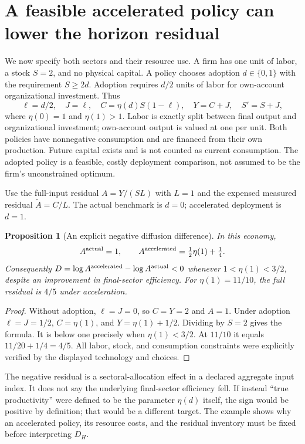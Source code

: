 \documentclass[11pt]{article}
\newtheorem{proposition}[theorem]{Proposition}
\theoremstyle{remark}
\begin{document}
\section{A feasible accelerated policy can lower the horizon residual}
We now specify both sectors and their resource use. A firm has one unit of labor, a stock $S=2$, and no physical capital. A policy chooses adoption $d\in\{0,1\}$ with the requirement $S\geq2d$. Adoption requires $d/2$ units of labor for own-account organizational investment. Thus
\[
 \ell=d/2,\quad J=\ell,\quad C=\eta(d)S(1-\ell),
 \quad Y=C+J,\quad S'=S+J,
\]
where $\eta(0)=1$ and $\eta(1)>1$. Labor is exactly split between final output and organizational investment; own-account output is valued at one per unit. Both policies have nonnegative consumption and are financed from their own production. Future capital exists and is not counted as current consumption. The adopted policy is a feasible, costly deployment comparison, not assumed to be the firm's unconstrained optimum.

Use the full-input residual $A=Y/(SL)$ with $L=1$ and the expensed measured residual $\widetilde A=C/L$. The actual benchmark is $d=0$; accelerated deployment is $d=1$.

\begin{proposition}[An explicit negative diffusion difference]\label{negative}
In this economy,
\[
 A^{\rm actual}=1,\qquad A^{\rm accelerated}=\tfrac12\eta(1)+\tfrac14.
\]
Consequently $D=\log A^{\rm accelerated}-\log A^{\rm actual}<0$ whenever $1<\eta(1)<3/2$, despite an improvement in final-sector efficiency. For $\eta(1)=11/10$, the full residual is $4/5$ under acceleration.
\end{proposition}
\begin{proof}
Without adoption, $\ell=J=0$, so $C=Y=2$ and $A=1$. Under adoption $\ell=J=1/2$, $C=\eta(1)$, and $Y=\eta(1)+1/2$. Dividing by $S=2$ gives the formula. It is below one precisely when $\eta(1)<3/2$. At $11/10$ it equals $11/20+1/4=4/5$. All labor, stock, and consumption constraints were explicitly verified by the displayed technology and choices.
\end{proof}

The negative residual is a sectoral-allocation effect in a declared aggregate input index. It does not say the underlying final-sector efficiency fell. If instead ``true productivity'' were defined to be the parameter $\eta(d)$ itself, the sign would be positive by definition; that would be a different target. The example shows why an accelerated policy, its resource costs, and the residual inventory must be fixed before interpreting $D_H$.
\end{document}
